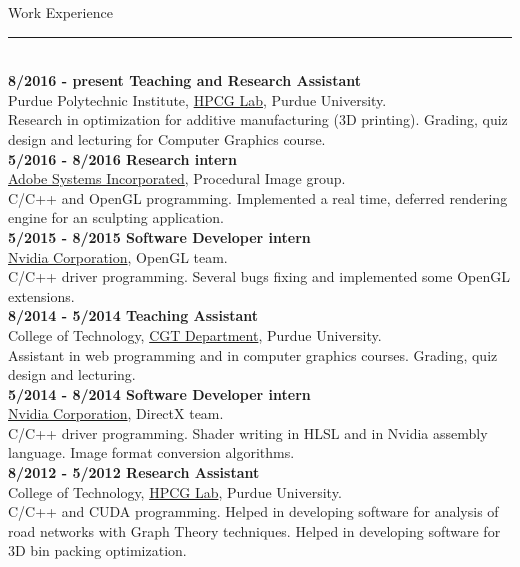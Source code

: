 \documentclass[letterpaper,10pt]{article}
\begin{document}
\begin{minipage}{0.5\textwidth}
\vspace*{0.25cm}
 {\large{Work Experience}} \\
 \textcolor{Dandelion}{\rule{0.5\textwidth}{0.05in}} \\
\textbf{8/2016 - present Teaching and Research Assistant} \\
Purdue Polytechnic Institute, \href{http://hpcg.purdue.edu/}{HPCG Lab}, Purdue University. \\
Research in optimization for additive manufacturing (3D printing). Grading, quiz design and lecturing for Computer Graphics course.\\

\textbf{5/2016 - 8/2016 Research intern} \\
\href{http://www.adobe.com/}{Adobe Systems Incorporated}, Procedural Image group. \\
C/C++ and OpenGL programming. Implemented a real time, deferred rendering engine for an sculpting application.\\

\textbf{5/2015 - 8/2015 Software Developer intern} \\
\href{http://www.nvidia.com/}{Nvidia Corporation}, OpenGL team. \\
C/C++ driver programming. Several bugs fixing and implemented some OpenGL extensions.\\

\textbf{8/2014 - 5/2014 Teaching Assistant} \\
College of Technology, \href{http://tech.purdue.edu/degrees/computer-graphics-technology}{CGT Department}, Purdue University. \\
Assistant in web programming and in computer graphics courses. Grading, quiz design and lecturing.\\

\textbf{5/2014 - 8/2014 Software Developer intern} \\
\href{http://www.nvidia.com/}{Nvidia Corporation}, DirectX team. \\
C/C++ driver programming. Shader writing in HLSL and in Nvidia assembly language. Image format conversion algorithms.\\

\textbf{8/2012 - 5/2012 Research Assistant} \\
College of Technology, \href{http://hpcg.purdue.edu/}{HPCG Lab}, Purdue University. \\
C/C++ and CUDA programming. Helped in developing software for analysis of road networks with Graph Theory techniques. Helped in developing software for 3D bin packing optimization.\\


\end{minipage}
\end{document}
